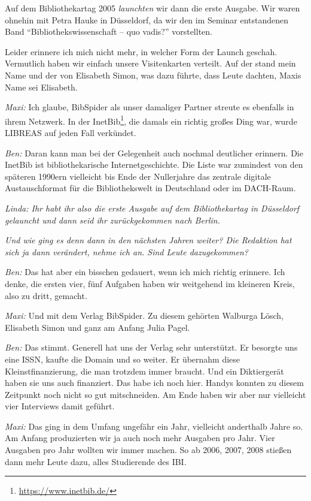 \documentclass[a4paper,
fontsize=11pt,
oneside,
numbers=noperiodatend,
parskip=half-,
bibliography=totoc,
final
]{scrartcl}
\begin{document}
Auf dem Bibliothekartag 2005 \emph{launchten} wir dann die erste
Ausgabe. Wir waren ohnehin mit Petra Hauke in Düsseldorf, da wir den im
Seminar entstandenen Band \enquote{Bibliothekswissenschaft -- quo vadis?}
vorstellten.

Leider erinnere ich mich nicht mehr, in welcher Form der Launch geschah.
Vermutlich haben wir einfach unsere Visitenkarten verteilt. Auf der
stand mein Name und der von Elisabeth Simon, was dazu führte, dass Leute
dachten, Maxis Name sei Elisabeth.

\emph{Maxi:} Ich glaube, BibSpider als unser damaliger Partner streute
es ebenfalls in ihrem Netzwerk. In der InetBib\footnote{\url{https://www.inetbib.de/}},
die damals ein richtig großes Ding war, wurde LIBREAS auf jeden Fall
verkündet.

\emph{Ben:} Daran kann man bei der Gelegenheit auch nochmal deutlicher
erinnern. Die InetBib ist bibliothekarische Internetgeschichte. Die
Liste war zumindest von den späteren 1990ern vielleicht bis Ende der
Nullerjahre das zentrale digitale Austauschformat für die
Bibliothekswelt in Deutschland oder im DACH-Raum.

\emph{Linda: Ihr habt ihr also die erste Ausgabe auf dem Bibliothekartag
in Düsseldorf gelauncht und dann seid ihr zurückgekommen nach Berlin.}

\emph{Und wie ging es denn dann in den nächsten Jahren weiter? Die
Redaktion hat sich ja dann verändert, nehme ich an. Sind Leute
dazugekommen?}

\emph{Ben:} Das hat aber ein bisschen gedauert, wenn ich mich richtig
erinnere. Ich denke, die ersten vier, fünf Aufgaben haben wir weitgehend
im kleineren Kreis, also zu dritt, gemacht.

\emph{Maxi:} Und mit dem Verlag BibSpider. Zu diesem gehörten Walburga
Lösch, Elisabeth Simon und ganz am Anfang Julia Pagel.

\emph{Ben:} Das stimmt. Generell hat uns der Verlag sehr unterstützt. Er
besorgte uns eine ISSN, kaufte die Domain und so weiter. Er übernahm
diese Kleinstfinanzierung, die man trotzdem immer braucht. Und ein
Diktiergerät haben sie uns auch finanziert. Das habe ich noch hier.
Handys konnten zu diesem Zeitpunkt noch nicht so gut mitschneiden. Am
Ende haben wir aber nur vielleicht vier Interviews damit geführt.

\emph{Maxi:} Das ging in dem Umfang ungefähr ein Jahr, vielleicht
anderthalb Jahre so. Am Anfang produzierten wir ja auch noch mehr
Ausgaben pro Jahr. Vier Ausgaben pro Jahr wollten wir immer machen. So
ab 2006, 2007, 2008 stießen dann mehr Leute dazu, alles Studierende des
IBI.
\end{document}
